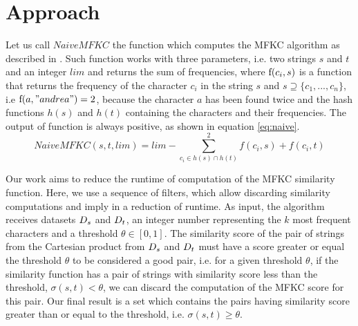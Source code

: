 \section{Approach} \label{mfkc}

Let us call $NaiveMFKC$ the function which computes the MFKC algorithm as described in \cite{seker2014novel}.
Such function works with three parameters, i.e. two strings $s$ and $t$ and an integer $lim$ and returns the sum of frequencies, where $\textnormal{f}(c_i, s)$ is a function that returns the frequency of the character $c_i$ in the string $s$ and $s \supseteq \{c_1,...,c_n\}$, i.e $\textnormal{f}(a,"andrea")=2$, because the character $a$ has been found twice and the hash functions $h(s)$ and $h(t)$ containing the characters and their frequencies. The output of function is always positive, as shown in equation \ref{eq:naive}. 
\begin{equation} \label{eq:naive}
	NaiveMFKC(s, t, lim) = lim - \sum_{c_i \in h(s) \cap h(t)}^2 f(c_i,s) + f(c_i,t)
\end{equation}

Our work aims to reduce the runtime of computation of the MFKC similarity function.
Here, we use a sequence of filters, which allow discarding similarity computations and imply in a reduction of runtime.
As input, the algorithm receives datasets ${D_s}{}$ and ${D_t}{}$, an integer number representing the $k$ most frequent characters and a threshold $\theta \in [0,1]$.
The similarity score of the pair of strings from the Cartesian product from ${D_s}{}$ and ${D_t}{}$ must have a score greater or equal the threshold $\theta$ to be considered a good pair, i.e. 
for a given threshold $\theta$, if the similarity function has a pair of strings with similarity score less than the threshold, $\sigma (s, t) < \theta$, we can discard the computation of the MFKC score for this pair. Our final result is a set which contains the pairs having similarity score greater than or equal to the threshold, i.e. $\sigma(s,t) \geq \theta$.


